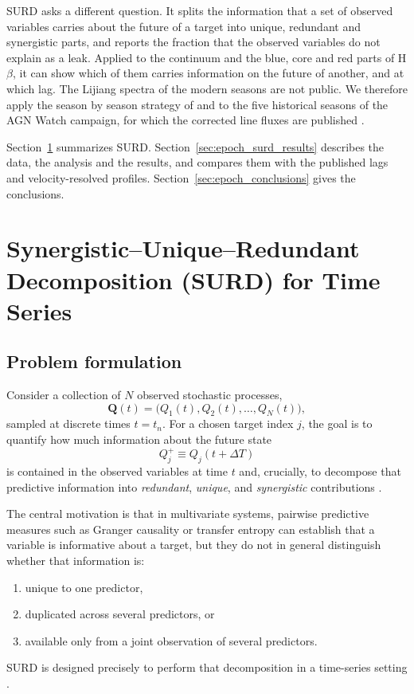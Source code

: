 \documentclass[fleqn,usenatbib]{mnras}
\begin{document}
SURD \citep{MartinezSanchez2024SURD} asks a different question. It splits the information that a set of observed variables carries about the future of a target into unique, redundant and synergistic parts, and reports the fraction that the observed variables do not explain as a leak. Applied to the continuum and the blue, core and red parts of H$\beta$, it can show which of them carries information on the future of another, and at which lag. The Lijiang spectra of the modern seasons are not public. We therefore apply the season by season strategy of \citet{Lu2022} and \citet{Xi2025} to the five historical seasons of the AGN Watch campaign, for which the corrected line fluxes are published \citep{WandersPeterson1996}.

Section~\ref{sec:surd_method} summarizes SURD. Section~\ref{sec:epoch_surd_results} describes the data, the analysis and the results, and compares them with the published lags and velocity-resolved profiles. Section~\ref{sec:epoch_conclusions} gives the conclusions.

\section{Synergistic--Unique--Redundant Decomposition (SURD) for Time Series}
\label{sec:surd_method}

\subsection{Problem formulation}

Consider a collection of \(N\) observed stochastic processes,
\begin{equation}
\mathbf{Q}(t)=\bigl(Q_1(t),Q_2(t),\ldots,Q_N(t)\bigr),
\end{equation}
sampled at discrete times \(t=t_n\). For a chosen target index \(j\), the goal is to quantify how much information about the future state
\begin{equation}
Q_j^+ \equiv Q_j(t+\Delta T)
\end{equation}
is contained in the observed variables at time \(t\) and, crucially, to decompose that predictive information into \emph{redundant}, \emph{unique}, and \emph{synergistic} contributions \citep{MartinezSanchez2024SURD}.

The central motivation is that in multivariate systems, pairwise predictive measures such as Granger causality or transfer entropy can establish that a variable is informative about a target, but they do not in general distinguish whether that information is:
\begin{enumerate}
    \item unique to one predictor,
    \item duplicated across several predictors, or
    \item available only from a joint observation of several predictors.
\end{enumerate}
SURD is designed precisely to perform that decomposition in a time-series setting \citep{MartinezSanchez2024SURD,Schreiber2000,WilliamsBeer2010}.
\end{document}
